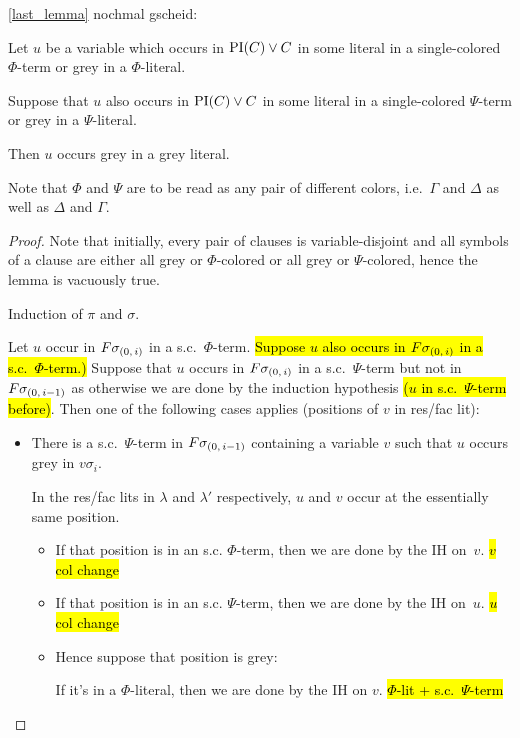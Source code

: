 \documentclass[,%
	draft=false,%
	numbers=noendperiod
	12pt,
	a4paper,
	oneside,%
	openany,
]{memoir}
\begin{document}
{\tiny
\begin{clemma}
	\ref{last_lemma} nochmal gscheid:

	Let $u$ be a variable which occurs in $\operatorname{PI}(C)\lor C$ in some literal in a single-colored $\Phi$-term or grey in a $\Phi$-literal.

	Suppose that $u$ also occurs in $\operatorname{PI}(C) \lor C$ in some literal in a single-colored $\Psi$-term or grey in a $\Psi$-literal.

	Then $u$ occurs grey in a grey literal.

\end{clemma}
Note that $\Phi$ and $\Psi$ are to be read as any pair of different colors, i.e.\ $\Gamma$ and $\Delta$ as well as $\Delta$ and $\Gamma$.
\begin{proof}
	Note that initially, every pair of clauses is variable-disjoint and all symbols of a clause are either all grey or $\Phi$-colored or all grey or $\Psi$-colored, hence the lemma is vacuously true.

	Induction of $\pi$ and $\sigma$.

	Let $u$ occur in $F\sigma_{(0,\,i)}$ in a s.c.\ $\Phi$-term.
	\hl{Suppose $u$ also occurs in $F\sigma_{(0,\,i)}$ in a s.c.\ $\Phi$-term.)}
	Suppose that $u$ occurs in $F\sigma_{(0,\,i)}$ in a s.c.\ $\Psi$-term but not in $F\sigma_{(0,\,i-1)}$ as otherwise we are done by the induction hypothesis \hl{($u$ in s.c.\ $\Psi$-term before)}.
	Then one of the following cases applies (positions of $v$ in res/fac lit):
	\begin{itemize}
		\item There is a s.c.\ $\Psi$-term in $F\sigma_{(0,\,i-1)}$ containing a variable $v$ such that $u$ occurs grey in $v\sigma_i$.

			In the res/fac lits in $\lambda$ and $\lambda'$ respectively, $u$ and $v$ occur at the essentially same position.

			\begin{itemize}
				\item
					If that position is in an s.c. $\Phi$-term, then we are done by the IH on~$v$.
					\hl{$v$ col change}

				\item
					If that position is in an s.c. $\Psi$-term, then we are done by the IH on~$u$.
					\hl{$u$ col change} 

				\item
					Hence suppose that position is grey:

					If it's in a $\Phi$-literal, then we are done by the IH on $v$. \hl{$\Phi$-lit + s.c.\ $\Psi$-term}


\end{itemize}
\end{itemize}
\end{proof}}
\end{document}
